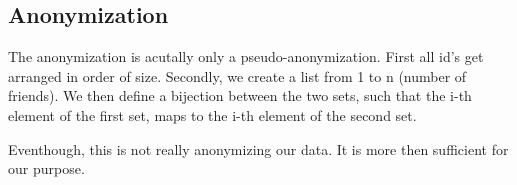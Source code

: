 \subsection{Anonymization}

The anonymization is acutally only a pseudo-anonymization. First all id's get arranged in order of size. Secondly, we create a list from 1 to n (number of friends). We then define a bijection between the two sets, such that the i-th element of the first set, maps to the i-th element of the second set. 

Eventhough, this is not really anonymizing our data. It is more then sufficient for our purpose. 




